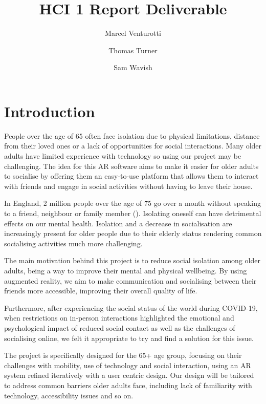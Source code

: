 \documentclass[12pt,a4paper]{article}
\begin{document}
\title{HCI 1 Report Deliverable}
\author{Marcel Venturotti}
\author{Thomas Turner}
\author{Sam Wavish}
\maketitle

\section{Introduction}

People over the age of 65 often face isolation due to physical limitations, distance from their loved ones or a lack of opportunities for social interactions. Many older adults have limited experience with technology so using our project may be challenging. The idea for this AR software aims to make it easier for older adults to socialise by offering them an easy-to-use platform that allows them to interact with friends and engage in social activities without having to leave their house. 
 
In England, 2 million people over the age of 75 go over a month without speaking to a friend, neighbour or family member (\cite{ELSA2024}). Isolating oneself can have detrimental effects on our mental health. Isolation and a decrease in socialisation are increasingly present for older people due to their elderly status rendering common socialising activities much more challenging. 

The main motivation behind this project is to reduce social isolation among older adults, being a way to improve their mental and physical wellbeing. By using augmented reality, we aim to make communication and socialising between their friends more accessible, improving their overall quality of life. 

Furthermore, after experiencing the social status of the world during COVID-19, when restrictions on in-person interactions highlighted the emotional and psychological impact of reduced social contact as well as the challenges of socialising online, we felt it appropriate to try and find a solution for this issue. 


The project is specifically designed for the 65+ age group, focusing on their challenges with mobility, use of technology and social interaction, using an AR system refined iteratively with a user centric design. Our design will be tailored to address common barriers older adults face, including lack of familiarity with technology, accessibility issues and so on.
\end{document}
